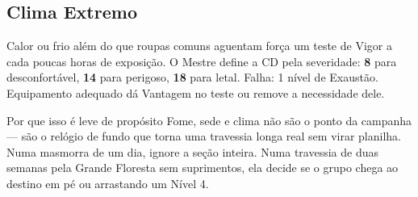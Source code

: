 \subsection{Clima Extremo}

Calor ou frio além do que roupas comuns aguentam força um teste de Vigor a cada poucas horas
de exposição. O Mestre define a CD pela severidade: \textbf{8} para desconfortável,
\textbf{14} para perigoso, \textbf{18} para letal. Falha: 1 nível de Exaustão. Equipamento
adequado dá Vantagem no teste ou remove a necessidade dele.

\begin{nota}{Por que isso é leve de propósito}
    Fome, sede e clima não são o ponto da campanha --- são o relógio de fundo que torna uma
    travessia longa real sem virar planilha. Numa masmorra de um dia, ignore a seção inteira.
    Numa travessia de duas semanas pela Grande Floresta sem suprimentos, ela decide se o
    grupo chega ao destino em pé ou arrastando um Nível 4.
\end{nota}
